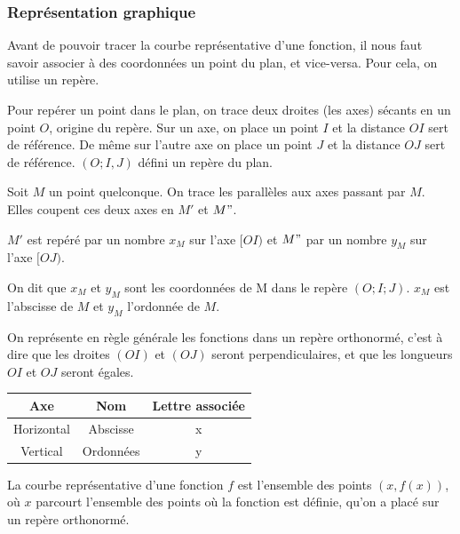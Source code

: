 \documentclass[10pt,a4paper]{book}
\begin{document}
\subsubsection{Représentation graphique}

Avant de pouvoir tracer la courbe représentative d'une fonction, il nous faut savoir associer à des coordonnées un point du plan, et vice-versa. Pour cela, on utilise un repère.

\begin{de}[Repère]
Pour repérer un point dans le plan, on trace deux droites (les axes) sécants en un point $O$, origine du repère. Sur un axe, on place un point $I$ et la distance $OI$ sert de référence. De même sur l'autre axe on place un point $J$ et la distance $OJ$ sert de référence. $(O;I,J)$ défini un repère du plan. 

 Soit $M$ un point quelconque. On trace les parallèles aux axes passant par $M$. Elles coupent ces deux axes en $M'$ et $M"$.

$M'$ est repéré par un nombre $x_{M}$ sur l'axe $[OI)$ et $M"$ par un nombre $y_{M}$ sur l'axe $[OJ)$.

On dit que $x_{M}$ et $y_{M}$ sont les coordonnées de M dans le repère $(O;I;J)$. $x_{M}$ est l’abscisse de $M$ et $y_{M}$ l’ordonnée de $M$.
\end{de}


On représente en règle générale les fonctions dans un repère orthonormé, c'est à dire que les droites $(OI)$ et $(OJ)$ seront perpendiculaires, et que les longueurs $OI$ et $OJ$ seront égales.

\begin{center}
    \begin{tabular}{|c|c|c|}
        \hline
         Axe & Nom & Lettre associée  \\
        \hline
        Horizontal & Abscisse & x \\
        \hline
        Vertical & Ordonnées & y \\
        \hline
    \end{tabular}
\end{center}

\begin{de}
    La courbe représentative d'une fonction $f$ est l'ensemble des points $(x,f(x))$, où $x$ parcourt l'ensemble des points où la fonction est définie, qu'on a placé sur un repère orthonormé.
\end{de}
\end{document}
